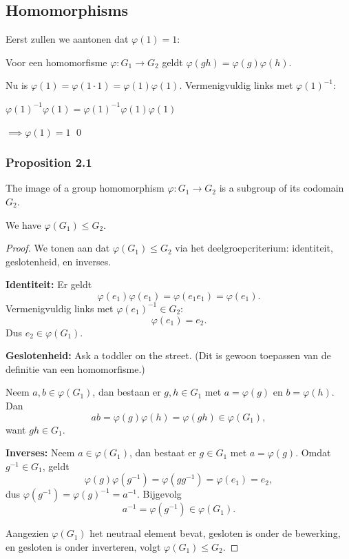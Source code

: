 \subsection{Homomorphisms}

Eerst zullen we aantonen dat \(\varphi(1) = 1\):

Voor een homomorfisme \(\varphi: G_1 \to G_2\) geldt \(\varphi(gh) = \varphi(g)\varphi(h)\).

Nu is \(\varphi(1) = \varphi(1 \cdot 1) = \varphi(1)\varphi(1)\). Vermenigvuldig links met \(\varphi(1)^{-1}\):

\(\varphi(1)^{-1}\varphi(1) = \varphi(1)^{-1}\varphi(1)\varphi(1)\)

\(\implies \varphi(1) = 1\)
\qed

\subsubsection{Proposition 2.1}

\begin{proposition}
    The image of a group homomorphism $\varphi: G_1 \to G_2$ is a subgroup of its codomain $G_2$.

    We have \(\varphi(G_1) \leq G_2\).
\end{proposition}

\begin{proof}
    We tonen aan dat $\varphi(G_1) \leq G_2$ via het deelgroepcriterium: identiteit, geslotenheid, en inverses.

    \textbf{Identiteit:} Er geldt
    \[
        \varphi(e_1)\varphi(e_1) = \varphi(e_1 e_1) = \varphi(e_1).
    \]
    Vermenigvuldig links met $\varphi(e_1)^{-1} \in G_2$:
    \[
        \varphi(e_1) = e_2.
    \]
    Dus $e_2 \in \varphi(G_1)$.

    \textbf{Geslotenheid:} Ask a toddler on the street. (Dit is gewoon toepassen van de definitie van een homomorfisme.)

    Neem $a, b \in \varphi(G_1)$, dan bestaan er $g, h \in G_1$ met $a = \varphi(g)$ en $b = \varphi(h)$. Dan
    \[
        ab = \varphi(g)\varphi(h) = \varphi(gh) \in \varphi(G_1),
    \]
    want $gh \in G_1$.

    \textbf{Inverses:} Neem $a \in \varphi(G_1)$, dan bestaat er $g \in G_1$ met $a = \varphi(g)$. Omdat $g^{-1} \in G_1$, geldt
    \[
        \varphi(g)\varphi(g^{-1}) = \varphi(gg^{-1}) = \varphi(e_1) = e_2,
    \]
    dus $\varphi(g^{-1}) = \varphi(g)^{-1} = a^{-1}$. Bijgevolg
    \[
        a^{-1} = \varphi(g^{-1}) \in \varphi(G_1).
    \]

    Aangezien $\varphi(G_1)$ het neutraal element bevat, gesloten is onder de bewerking, en gesloten is onder inverteren, volgt $\varphi(G_1) \leq G_2$.
\end{proof}
